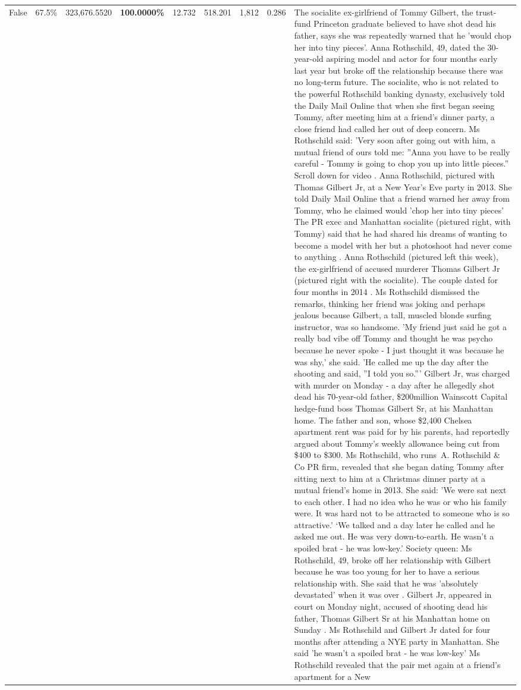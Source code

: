\begin{table}[H]
\begin{tabular}{lllrlllll}
False & 67.5\% & 323,676.5520 & \bfseries \color{red} 100.0000\% & 12.732 & 518.201 & 1,812 & 0.286 & The socialite ex-girlfriend of Tommy Gilbert, the trust-fund Princeton graduate believed to have shot dead his father, says she was repeatedly warned that he 'would chop her into tiny pieces'. Anna Rothschild, 49, dated the 30-year-old aspiring model and actor for four months early last year but broke off the relationship because there was no long-term future. The socialite, who is not related to the powerful Rothschild banking dynasty, exclusively told the Daily Mail Online that when she first began seeing Tommy, after meeting him at a friend's dinner party, a close friend had called her out of deep concern. Ms Rothschild said: 'Very soon after going out with him, a mutual friend of ours told me: ''Anna you have to be really careful - Tommy is going to chop you up into little pieces.'' Scroll down for video . Anna Rothschild, pictured with Thomas Gilbert Jr, at a New Year's Eve party in 2013. She told Daily Mail Online that a friend warned her away from Tommy, who he claimed would 'chop her into tiny pieces' The PR exec and Manhattan socialite (pictured right, with Tommy) said that he had shared his dreams of wanting to become a model with her but a photoshoot had never come to anything . Anna Rothschild (pictured left this week), the ex-girlfriend of accused murderer Thomas Gilbert Jr (pictured right with the socialite). The couple dated for four months in 2014 . Ms Rothschild dismissed the remarks, thinking her friend was joking and perhaps jealous because Gilbert, a tall, muscled blonde surfing instructor, was so handsome. 'My friend just said he got a really bad vibe off Tommy and thought he was psycho because he never spoke - I just thought it was because he was shy,' she said. 'He called me up the day after the shooting and said, ''I told you so.''' Gilbert Jr, was charged with murder on Monday - a day after he allegedly shot dead his 70-year-old father, \$200million Wainscott Capital hedge-fund boss Thomas Gilbert Sr, at his Manhattan home. The father and son, whose \$2,400 Chelsea apartment rent was paid for by his parents, had reportedly argued about Tommy's weekly allowance being cut from \$400 to \$300. Ms Rothschild, who runs A. Rothschild \& Co PR firm, revealed that she began dating Tommy after sitting next to him at a Christmas dinner party at a mutual friend's home in 2013. She said: 'We were sat next to each other. I had no idea who he was or who his family were. It was hard not to be attracted to someone who is so attractive.' ‘We talked and a day later he called and he asked me out. He was very down-to-earth. He wasn’t a spoiled brat - he was low-key.’ Society queen: Ms Rothschild, 49, broke off her relationship with Gilbert because he was too young for her to have a serious relationship with. She said that he was 'absolutely devastated' when it was over . Gilbert Jr, appeared in court on Monday night, accused of shooting dead his father, Thomas Gilbert Sr at his Manhattan home on Sunday . Ms Rothschild and Gilbert Jr dated for four months after attending a NYE party in Manhattan. She said 'he wasn't a spoiled brat - he was low-key' Ms Rothschild revealed that the pair met again at a friend’s apartment for a New 
\end{tabular}
\end{table}

